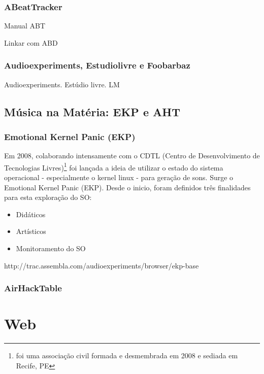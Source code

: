       \subsubsection{ABeatTracker}


  Manual ABT

  Linkar com ABD

      \subsubsection{Audioexperiments, Estudiolivre e Foobarbaz}

      Audioexperiments. Estúdio livre. LM





  \subsection{Música na Matéria: EKP e AHT}
      \subsubsection{Emotional Kernel Panic (EKP)}

Em 2008, colaborando intensamente com o CDTL
(Centro de Desenvolvimento de Tecnologias Livres)\footnote{foi uma associação civil formada e desmembrada em 2008 e sediada em Recife, PE}
foi lançada a ideia de utilizar o estado do sistema operacional - especialmente o kernel linux - para
geração de sons. Surge o Emotional Kernel Panic (EKP). Desde o inicio, foram definidos três finalidades
para esta exploração do SO:

\begin{itemize}
    \item Didáticos
    \item Artísticos
    \item Monitoramento do SO
\end{itemize}

http://trac.assembla.com/audioexperiments/browser/ekp-base


      \subsubsection{AirHackTable}



  \section{Web}

